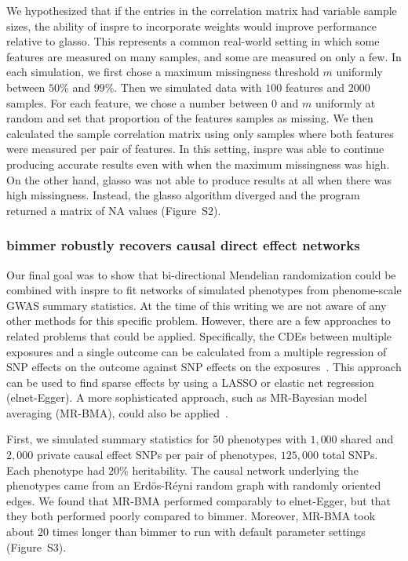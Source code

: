 \documentclass{article}
\begin{document}
We hypothesized that if the entries in the correlation matrix had variable
sample sizes, the ability of inspre to incorporate weights would improve
performance relative to glasso. This represents a common real-world setting in
which some features are measured on many samples, and some are measured
on only a few. In each simulation, we first chose a maximum missingness
threshold $m$ uniformly between $50\%$ and $99\%$. Then we simulated data with
$100$ features and $2000$ samples. For each feature, we chose
a number between $0$ and $m$ uniformly at random and set that proportion of the features
samples as missing. We then calculated the sample correlation matrix using only
samples where both features were measured per pair of features.
In this setting, inspre was able to continue producing accurate
results even with when the maximum missingness was high. On the other
hand, glasso was not able to produce results at all when there was high
missingness. Instead, the glasso algorithm diverged and the program returned
a matrix of NA values (Figure~S2).


\subsubsection*{bimmer robustly recovers causal direct effect networks}

Our final goal was to show that bi-directional Mendelian randomization
could be combined with inspre to fit networks of simulated phenotypes
from phenome-scale GWAS summary statistics. At the time of this writing
we are not aware of any other methods for this specific problem. However,
there are a few approaches to related problems that could be applied.
Specifically, the CDEs between multiple exposures and a single outcome
can be calculated from a multiple regression of SNP effects on the outcome
against SNP effects on the exposures~\cite{Burgess2015a}. This approach can be used
to find sparse effects by using a LASSO or elastic net regression (elnet-Egger). A more
sophisticated approach, such as MR-Bayesian model averaging (MR-BMA), could also be
applied~\cite{Zuber2020}.

First, we simulated summary
statistics for $50$ phenotypes with $1,000$ shared and $2,000$ private
causal effect SNPs per pair of phenotypes, $125,000$ total SNPs. Each
phenotype had $20\%$ heritability. The causal
network underlying the phenotypes came from an Erd\"os-R\'eyni random graph with
randomly oriented edges. We found that MR-BMA performed comparably to
elnet-Egger, but that they both performed poorly compared to bimmer.
Moreover, MR-BMA took about $20$ times longer than bimmer to run with
default parameter settings (Figure~S3).
\end{document}
